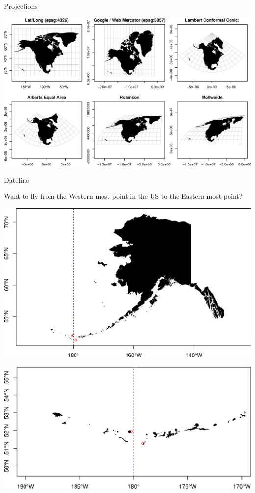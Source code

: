 \documentclass[11pt,ignorenonframetext,]{beamer}
\begin{document}
\begin{frame}{Projections}

\begin{center}\includegraphics{Lec16_files/figure-beamer/unnamed-chunk-4-1} \end{center}

\end{frame}

\begin{frame}{Dateline}

Want to fly from the Western most point in the US to the Eastern most
point?

\begin{center}\includegraphics{Lec16_files/figure-beamer/unnamed-chunk-5-1} \end{center}

\end{frame}

\begin{frame}{}

\includegraphics{Lec16_files/figure-beamer/unnamed-chunk-6-1.pdf}

\end{frame}
\end{document}
